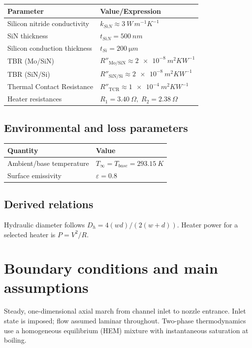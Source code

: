 \documentclass[11pt,a4paper]{article}
\begin{document}
\vspace{15pt}


\begin{tabular}{@{}ll@{}}
\toprule
Parameter & Value/Expression \\
\midrule
Silicon nitride conductivity & \(k_{SiN}\approx\SI{3}{W\,m^{-1}K^{-1}}\) \\
SiN thickness & \(t_{SiN}=\SI{500}{nm}\) \\
Silicon conduction thickness & \(t_{Si}=\SI{200}{\micro m}\) \\
TBR (Mo/SiN) & \(R''_{\text{Mo/SiN}}\approx\SI{2e-8}{m^2 K W^{-1}}\) \\
TBR (SiN/Si) & \(R''_{\text{SiN/Si}}\approx\SI{2e-8}{m^2 K W^{-1}}\) \\
Thermal Contact Resistance & \(R''_{\text{TCR}}\approx\SI{1e-4}{m^2 K W^{-1}}\) \\
Heater resistances & \(R_1=\SI{3.40}{\Omega},\;R_2=\SI{2.38}{\Omega}\) \\
\bottomrule
\end{tabular}

\subsection*{Environmental and loss parameters}
\begin{tabular}{@{}ll@{}}
  \toprule
Quantity & Value \\
\midrule
Ambient/base temperature & \(T_\infty=T_{base}=\SI{293.15}{K}\) \\
Surface emissivity & \(\varepsilon=0.8\) \\
\bottomrule
\end{tabular}

\subsection*{Derived relations}
Hydraulic diameter follows \(D_h=4(w d)/(2(w+d))\). Heater power for a selected heater is \(P=V^2/R\).

\section{Boundary conditions and main assumptions}
\begin{tcolorbox}[colback=gray!3!white,colframe=gray!50!black,title=Summary,left=1mm,right=1mm,top=0.6mm,bottom=0.6mm]
Steady, one-dimensional axial march from channel inlet to nozzle entrance. Inlet state is imposed; flow assumed laminar throughout. Two-phase thermodynamics use a homogeneous equilibrium (HEM) mixture with instantaneous saturation at boiling.
\end{tcolorbox}
\end{document}
